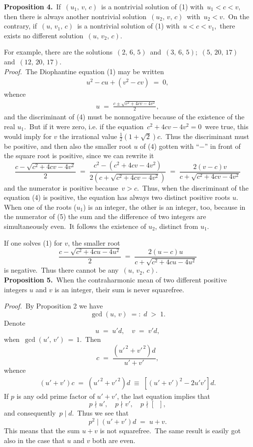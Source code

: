 \documentclass[12pt]{article}
\theoremstyle{definition}
\begin{document}
\textbf{Proposition 4.}\,  If\, $(u_1,\,v,\,c)$\, is a nontrivial solution of (1) with\,  $u_1 < c < v$,\, then there is always another nontrivial solution\, $(u_2,\,v,\,c)$\, with\, $u_2 < v$.\, On the contrary, if\, $(u,\,v_1,\,c)$\, is a nontrivial solution of (1) with\,  $u < c < v_1$,\, there exists no different solution\, $(u,\,v_2,\,c)$.


For example, there are the solutions\, $(2,\,6,\,5)$\, and\, $(3,\,6,\,5)$;\, 
$(5,\,20,\,17)$\, and\, $(12,\,20,\,17)$.\\

\emph{Proof.}\, The Diophantine equation (1) may be written
\begin{align}
u^2\!-\!cu\!+\!(v^2\!-\!cv) \;=\; 0,
\end{align}
whence 
\begin{align}
u \;=\; \frac{c\!\pm\!\sqrt{c^2\!+\!4cv\!-\!4v^2}}{2},
\end{align}
and the discriminant of (4) must be nonnogative because of the existence of the real  $u_1$.\, But if it were zero, i.e. if the equation \,$c^2\!+\!4cv\!-\!4v^2 = 0$\, were true, this would imply for $v$ the irrational value 
$\frac{1}{2}(1\!+\!\sqrt{2})c$.\, Thus the discriminant must be positive, and then also the smaller root $u$ of (4) gotten with ``$-$'' in front of the square root is positive, since we can rewrite it 
$$\frac{c\!-\!\sqrt{c^2\!+\!4cv\!-\!4v^2}}{2} 
\;=\; \frac{c^2\!-\!(c^2\!+\!4cv\!-\!4v^2)}{2(c+\sqrt{c^2\!+\!4cv\!-\!4v^2})}
\;=\; \frac{2(v\!-\!c)v}{c\!+\!\sqrt{c^2\!+\!4cv\!-\!4v^2}}$$
and the numerator is positive because\, $v > c$.\, Thus, when the discriminant of the equation (4) is positive, the equation has always two distinct positive roots $u$.\, When one of the roots ($u_1$) is an integer, the other is an integer, too, because in the numerator of (5) the sum and the difference of two integers are simultaneously even.\, It follows the existence of $u_2$, distinct from $u_1$.

If one solves (1) for $v$, the smaller root
$$\frac{c\!-\!\sqrt{c^2\!+\!4cu\!-\!4u^2}}{2}  \;=\; \frac{2(u\!-\!c)u}{c\!+\!\sqrt{c^2\!+\!4cu\!-\!4u^2}}$$
is negative.\, Thus there cannot be any\, $(u,\,v_2,\,c)$.\\


\textbf{Proposition 5.}\, When the contraharmonic mean of two different positive integers $u$ and $v$ is an integer, their sum is never squarefree.

\emph{Proof.}\, By Proposition 2 we have
$$\gcd(u,\,v) \;=:\; d \;>\; 1.$$
Denote
$$u \;=\; u'd, \quad v \;=\; v'd,$$
when\, $\gcd(u',\,v') \,=\, 1$.\, Then
$$c \;=\; \frac{(u'^{\,2}\!+\!v'^{\,2})d}{u'\!+\!v'},$$
whence
\begin{align}
(u'\!+\!v')c \;=\; (u'^{\,2}\!+\!v'^{\,2})d \;\equiv\; [(u'\!+\!v')^2\!-\!2u'v']d.
\end{align}
If $p$ is any odd prime factor of $u'\!+\!v'$, the last equation implies that
$$p \nmid u', \quad p \nmid v', \quad p \nmid [\;\;],$$
and consequently\, $p \mid d$.\, Thus we see that
$$p^2 \mid (u'\!+\!v')d \;=\; u\!+\!v.$$
This means that the sum $u\!+\!v$ is not squarefree.\, The same result is easily got also in the case that $u$ and $v$ both are even.\\
\end{document}
